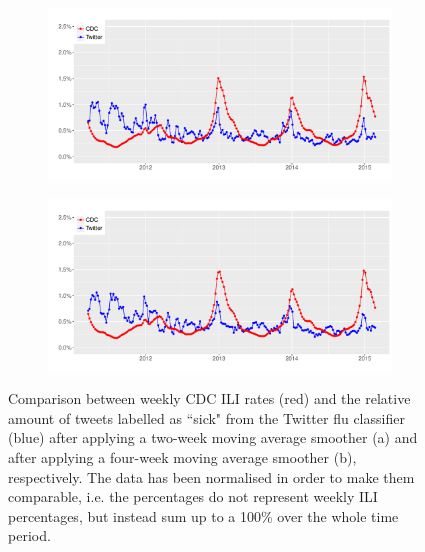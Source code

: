 \documentclass[11pt, a4paper,twoside]{report}\usepackage[]{graphicx}\usepackage[]{color}
\begin{document}
\begin{figure}[htbp!]
\centering
  \begin{subfigure}[t]{1\textwidth}
  \includegraphics[width=1\linewidth]{27_cdc_twitter_comp_nat_ma2.pdf}
  \caption{}
  \label{fig:cdc_tw_comp_nat_ma2}
  \end{subfigure}
  
  \begin{subfigure}[t]{1\textwidth}
  \includegraphics[width=1\linewidth]{28_cdc_twitter_comp_nat_ma4.pdf}
  \caption{}
  \label{fig:cdc_tw_comp_nat_ma4}
  \end{subfigure}
  \caption{Comparison between weekly CDC ILI rates (red) and the relative amount of tweets labelled as ``sick" from the Twitter flu classifier (blue) after applying a two-week moving average smoother (a) and after applying a four-week moving average smoother (b), respectively. The data has been normalised in order to make them comparable, i.e. the percentages do not represent weekly ILI percentages, but instead sum up to a 100\% over the whole time period.}
  \label{fig:cdc_tw_comp_nat_tot}
\end{figure}
\end{document}

